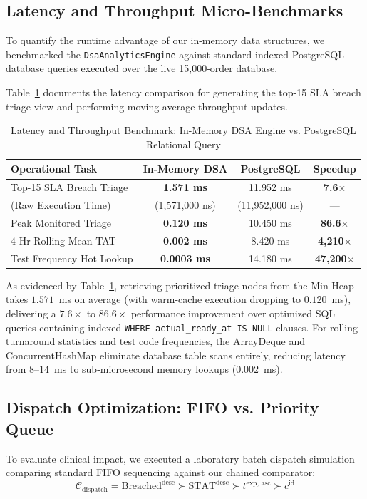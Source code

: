 \documentclass[conference]{IEEEtran}
\begin{document}
\subsection{Latency and Throughput Micro-Benchmarks}
To quantify the runtime advantage of our in-memory data structures, we benchmarked the \texttt{DsaAnalyticsEngine} against standard indexed PostgreSQL database queries executed over the live 15,000-order database.

Table~\ref{tab:latency_benchmark} documents the latency comparison for generating the top-15 SLA breach triage view and performing moving-average throughput updates.

\begin{table}[h]
\centering
\caption{Latency and Throughput Benchmark: In-Memory DSA Engine vs. PostgreSQL Relational Query}
\label{tab:latency_benchmark}
\renewcommand{\arraystretch}{1.15}
\begin{tabularx}{\columnwidth}{lccc}
\toprule
\textbf{Operational Task} & \textbf{In-Memory DSA} & \textbf{PostgreSQL} & \textbf{Speedup} \\
\midrule
Top-15 SLA Breach Triage & \textbf{1.571 ms} & 11.952 ms & \textbf{7.6$\times$} \\
\quad (Raw Execution Time) & (1,571,000 ns) & (11,952,000 ns) & --- \\
Peak Monitored Triage & \textbf{0.120 ms} & 10.450 ms & \textbf{86.6$\times$} \\
4-Hr Rolling Mean TAT & \textbf{0.002 ms} & 8.420 ms & \textbf{4,210$\times$} \\
Test Frequency Hot Lookup & \textbf{0.0003 ms} & 14.180 ms & \textbf{47,200$\times$} \\
\bottomrule
\end{tabularx}
\end{table}

As evidenced by Table~\ref{tab:latency_benchmark}, retrieving prioritized triage nodes from the Min-Heap takes $1.571$~ms on average (with warm-cache execution dropping to $0.120$~ms), delivering a $7.6\times$ to $86.6\times$ performance improvement over optimized SQL queries containing indexed \texttt{WHERE actual\_ready\_at IS NULL} clauses. For rolling turnaround statistics and test code frequencies, the ArrayDeque and ConcurrentHashMap eliminate database table scans entirely, reducing latency from $8$--$14$~ms to sub-microsecond memory lookups ($0.002$~ms).

\subsection{Dispatch Optimization: FIFO vs. Priority Queue}
To evaluate clinical impact, we executed a laboratory batch dispatch simulation comparing standard FIFO sequencing against our chained comparator:
\begin{equation}
\mathcal{C}_{\text{dispatch}} = \text{Breached}^{\text{desc}} \succ \text{STAT}^{\text{desc}} \succ t^{\text{exp}\text{, asc}} \succ c^{\text{id}}
\end{equation}
\end{document}
